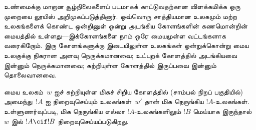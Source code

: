 \documentclass[../../../include/open-logic-section]{subfiles}
\begin{document}
உண்மைக்கு மாறான சூழ்நிலைகளைப் படமாகக் காட்டுவதற்கான விளக்கமிக்க ஒரு
முறையை லூயிஸ் அறிமுகப்படுத்தினார். ஒவ்வொரு சாத்தியமான உலகமும் மற்ற
உலகங்களைக் கொண்ட ஒன்றினுள் ஒன்று அடங்கிய கோளங்களின் கணமொன்றின் மையத்தில்
உள்ளது---இக்கோளங்களை நாம் ஒரே மையமுள்ள வட்டங்களாக வரைகிறோம். இரு
கோளங்களுக்கு இடையிலுள்ள உலகங்கள் ஒன்றுக்கொன்று மைய உலகுக்கு நிகரான
அளவு நெருக்கமானவை; உட்புறக் கோளத்தில் அடங்கியவை இன்னும் நெருக்கமானவை;
சுற்றியுள்ள கோளத்தில் இருப்பவை இன்னும் தொலைவானவை.
\begin{center}
\end{center}
மைய உலகம்~$w$ ஐச் சுற்றியுள்ள மிகச் சிறிய கோளத்தில் (சாம்பல் நிறப்
பகுதியில்) அமைந்து~$!A$ ஐ நிறைவுசெய்யும் உலகங்கள்~$w'$ தான் மிக
நெருங்கிய $!A$-உலகங்கள். உள்ளுணர்வுப்படி, மிக நெருங்கிய எல்லா
$!A$-உலகங்களிலும் $!B$ மெய்யாக இருந்தால்~$w$ இல் $!A \cif !B$
நிறைவுசெய்யப்படுகிறது.
\end{document}

